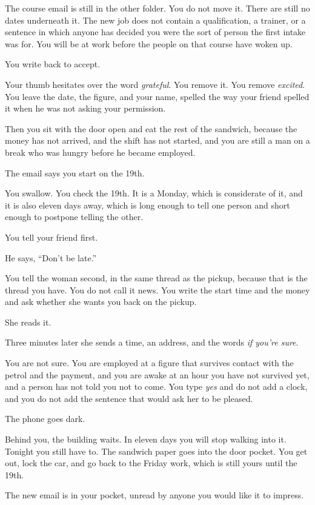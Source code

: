 \documentclass[11pt,oneside]{book}
\begin{document}
The course email is still in the other folder. You do not move it. There are still no dates underneath it. The new job does not contain a qualification, a trainer, or a sentence in which anyone has decided you were the sort of person the first intake was for. You will be at work before the people on that course have woken up.

You write back to accept.

Your thumb hesitates over the word \emph{grateful}. You remove it. You remove \emph{excited}. You leave the date, the figure, and your name, spelled the way your friend spelled it when he was not asking your permission.

Then you sit with the door open and eat the rest of the sandwich, because the money has not arrived, and the shift has not started, and you are still a man on a break who was hungry before he became employed.

The email says you start on the 19th.

You swallow. You check the 19th. It is a Monday, which is considerate of it, and it is also eleven days away, which is long enough to tell one person and short enough to postpone telling the other.

You tell your friend first.

He says, ``Don't be late.''

You tell the woman second, in the same thread as the pickup, because that is the thread you have. You do not call it news. You write the start time and the money and ask whether she wants you back on the pickup.

She reads it.

Three minutes later she sends a time, an address, and the words \emph{if you're sure}.

You are not sure. You are employed at a figure that survives contact with the petrol and the payment, and you are awake at an hour you have not survived yet, and a person has not told you not to come. You type \emph{yes} and do not add a clock, and you do not add the sentence that would ask her to be pleased.

The phone goes dark.

Behind you, the building waits. In eleven days you will stop walking into it. Tonight you still have to. The sandwich paper goes into the door pocket. You get out, lock the car, and go back to the Friday work, which is still yours until the 19th.

The new email is in your pocket, unread by anyone you would like it to impress.
\end{document}
